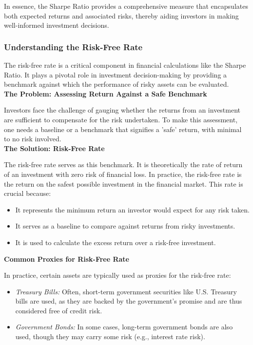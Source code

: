 \documentclass{article}
\begin{document}
In essence, the Sharpe Ratio provides a comprehensive measure that encapsulates both expected returns and associated risks, thereby aiding investors in making well-informed investment decisions.

\subsubsection{Understanding the Risk-Free Rate}

The risk-free rate is a critical component in financial calculations like the Sharpe Ratio. It plays a pivotal role in investment decision-making by providing a benchmark against which the performance of risky assets can be evaluated. \\

\textbf{The Problem: Assessing Return Against a Safe Benchmark}

Investors face the challenge of gauging whether the returns from an investment are sufficient to compensate for the risk undertaken. To make this assessment, one needs a baseline or a benchmark that signifies a 'safe' return, with minimal to no risk involved. \\

\textbf{The Solution: Risk-Free Rate}

The risk-free rate serves as this benchmark. It is theoretically the rate of return of an investment with zero risk of financial loss. In practice, the risk-free rate is the return on the safest possible investment in the financial market. This rate is crucial because:

\begin{itemize}
    \item It represents the minimum return an investor would expect for any risk taken.
    \item It serves as a baseline to compare against returns from risky investments.
    \item It is used to calculate the excess return over a risk-free investment.
\end{itemize}

\textbf{Common Proxies for Risk-Free Rate}

In practice, certain assets are typically used as proxies for the risk-free rate:

\begin{itemize}
    \item \textit{Treasury Bills:} Often, short-term government securities like U.S. Treasury bills are used, as they are backed by the government's promise and are thus considered free of credit risk.
    \item \textit{Government Bonds:} In some cases, long-term government bonds are also used, though they may carry some risk (e.g., interest rate risk).
\end{itemize}
\end{document}
